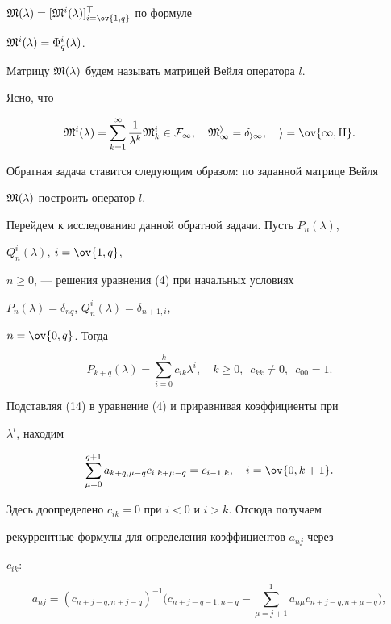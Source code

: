 $\frak M(\lambda)=[\frak M^i(\lambda)]^\top_{i=\ov{1,q}}$ по формуле 


$\frak M^i(\lambda)=\Phi^i_q(\lambda)$. 


Матрицу $\frak M(\lambda)$ будем называть матрицей Вейля оператора $l$. 


Ясно, что 


$$ 


\frak M^i(\lambda)=\sum^\infty_{k=1}\frac{1}{\lambda^k} 


\frak M^i_k\in\cal F_1,\quad 


\frak M^i_1=\delta_{i1},\quad i=\ov{1,q}. 


$$ 


Обратная задача ставится следующим образом: по заданной матрице Вейля 


$\frak M(\lambda)$ построить оператор $l$. 


 


Перейдем к исследованию данной обратной задачи. Пусть $P_n(\lambda)$, 


$Q^i_n(\lambda)$, $i=\ov{1,q}$, 


$n\ge 0$, --- решения уравнения (4) при начальных условиях 


$P_n(\lambda)=\delta_{nq}$, $Q^i_n(\lambda)=\delta_{n+1,i}$, 


$n=\ov{0,q}$. Тогда 


\begin{equation} 


P_{k+q}(\lambda)=\sum^k_{i=0}c_{ik}\lambda^i,\quad k\ge 0, 


\ \; c_{kk}\ne 0,\ \; c_{00}=1. 


\end{equation} 


Подставляя (14) в уравнение (4) и приравнивая коэффициенты при 


$\lambda^i$, находим 


$$ 


\sum^{q+1}_{\mu=0}a_{k+q,\mu-q}c_{i,k+\mu-q}= 


c_{i-1,k},\quad i=\ov{0,k+1}. 


$$ 


Здесь доопределено $c_{ik}=0$ при $i<0$ и $i>k$. Отсюда получаем 


рекуррентные формулы для определения коэффициентов $a_{nj}$ через 


$c_{ik}$: 


\begin{equation} 


a_{nj}=(c_{n+j-q,n+j-q})^{-1}\Big(c_{n+j-q-1,n-q}- 


\sum^1_{\mu=j+1}a_{n\mu}c_{n+j-q,n+\mu-q}\Big), 


\end{equation} 


